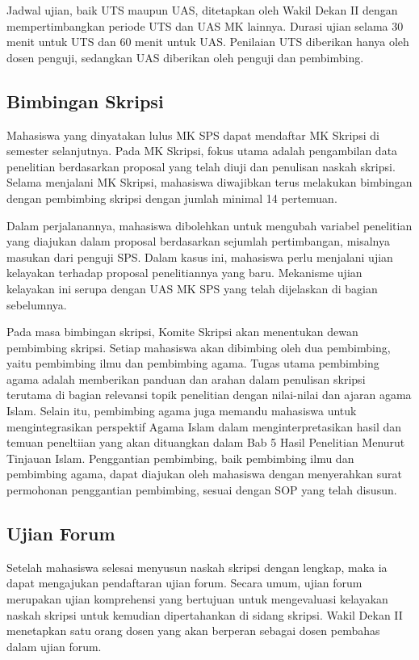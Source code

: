 \documentclass[
  indonesian,
  letterpaper,
]{scrbook}
\begin{document}
Jadwal ujian, baik UTS maupun UAS, ditetapkan oleh Wakil Dekan II dengan
mempertimbangkan periode UTS dan UAS MK lainnya. Durasi ujian selama 30
menit untuk UTS dan 60 menit untuk UAS. Penilaian UTS diberikan hanya
oleh dosen penguji, sedangkan UAS diberikan oleh penguji dan pembimbing.

\subsection*{Bimbingan Skripsi}\label{bimbingan-skripsi}

Mahasiswa yang dinyatakan lulus MK SPS dapat mendaftar MK Skripsi di
semester selanjutnya. Pada MK Skripsi, fokus utama adalah pengambilan
data penelitian berdasarkan proposal yang telah diuji dan penulisan
naskah skripsi. Selama menjalani MK Skripsi, mahasiswa diwajibkan terus
melakukan bimbingan dengan pembimbing skripsi dengan jumlah minimal 14
pertemuan.

Dalam perjalanannya, mahasiswa dibolehkan untuk mengubah variabel
penelitian yang diajukan dalam proposal berdasarkan sejumlah
pertimbangan, misalnya masukan dari penguji SPS. Dalam kasus ini,
mahasiswa perlu menjalani ujian kelayakan terhadap proposal
penelitiannya yang baru. Mekanisme ujian kelayakan ini serupa dengan UAS
MK SPS yang telah dijelaskan di bagian sebelumnya.

Pada masa bimbingan skripsi, Komite Skripsi akan menentukan dewan
pembimbing skripsi. Setiap mahasiswa akan dibimbing oleh dua pembimbing,
yaitu pembimbing ilmu dan pembimbing agama. Tugas utama pembimbing agama
adalah memberikan panduan dan arahan dalam penulisan skripsi terutama di
bagian relevansi topik penelitian dengan nilai-nilai dan ajaran agama
Islam. Selain itu, pembimbing agama juga memandu mahasiswa untuk
mengintegrasikan perspektif Agama Islam dalam menginterpretasikan hasil
dan temuan peneltiian yang akan dituangkan dalam Bab 5 Hasil Penelitian
Menurut Tinjauan Islam. Penggantian pembimbing, baik pembimbing ilmu dan
pembimbing agama, dapat diajukan oleh mahasiswa dengan menyerahkan surat
permohonan penggantian pembimbing, sesuai dengan SOP yang telah disusun.

\subsection*{Ujian Forum}\label{ujian-forum}

Setelah mahasiswa selesai menyusun naskah skripsi dengan lengkap, maka
ia dapat mengajukan pendaftaran ujian forum. Secara umum, ujian forum
merupakan ujian komprehensi yang bertujuan untuk mengevaluasi kelayakan
naskah skripsi untuk kemudian dipertahankan di sidang skripsi. Wakil
Dekan II menetapkan satu orang dosen yang akan berperan sebagai dosen
pembahas dalam ujian forum.
\end{document}
